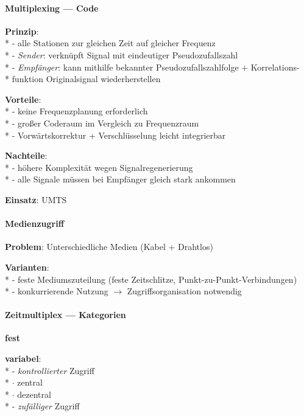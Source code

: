 \paragraph{Multiplexing --- Code}
\begin{items}
  \item \textbf{Prinzip}: \\*
    - alle Stationen zur gleichen Zeit auf gleicher Frequenz \\*
    - \emph{Sender}: verknüpft Signal mit eindeutiger Pseudozufallszahl \\*
    - \emph{Empfänger}: kann mithilfe bekannter Pseudozufallszahlfolge + Korrelations- \\* \phantom{-} \phantom{\( \cdot \)} funktion Originalsignal wiederherstellen
  \item \textbf{Vorteile}: \\*
    - keine Frequenzplanung erforderlich \\*
    - großer Coderaum im Vergleich zu Frequenzraum \\*
    - Vorwärtskorrektur + Verschlüsselung leicht integrierbar
  \item \textbf{Nachteile}: \\*
    - höhere Komplexität wegen Signalregenerierung \\*
    - alle Signale müssen bei Empfänger gleich stark ankommen
  \item \textbf{Einsatz}: UMTS
\end{items}

\paragraph{Medienzugriff}
\begin{items}
  \item \textbf{Problem}: Unterschiedliche Medien (Kabel + Drahtlos)
  \item \textbf{Varianten}: \\*
    - feste Mediumszuteilung (feste Zeitschlitze, Punkt-zu-Punkt-Verbindungen) \\*
    - konkurrierende Nutzung \( \to \) Zugriffsorganisation notwendig
\end{items}

\paragraph{Zeitmultiplex --- Kategorien}
\begin{items}
  \item \textbf{fest}
  \item \textbf{variabel}: \\*
    - \emph{kontrollierter} Zugriff \\*
      \phantom{-} \( \cdot \) zentral \\*
      \phantom{-} \( \cdot \) dezentral \\*
    - \emph{zufälliger} Zugriff
\end{items}

